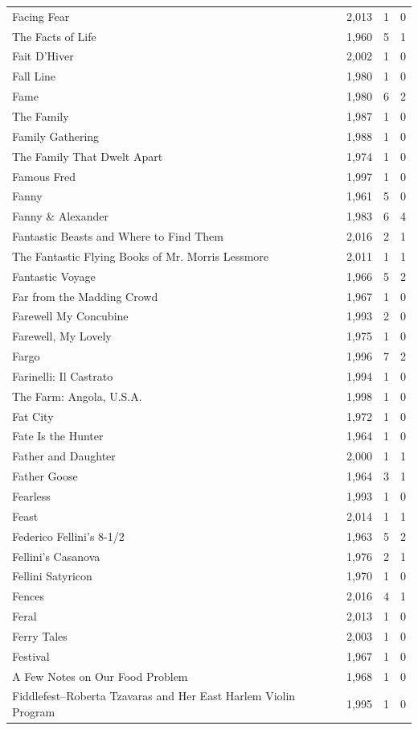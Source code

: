 \begin{tabular}{lrrr}
Facing Fear & 2,013 & 1 & 0 \\
The Facts of Life & 1,960 & 5 & 1 \\
Fait D'Hiver & 2,002 & 1 & 0 \\
Fall Line & 1,980 & 1 & 0 \\
Fame & 1,980 & 6 & 2 \\
The Family & 1,987 & 1 & 0 \\
Family Gathering & 1,988 & 1 & 0 \\
The Family That Dwelt Apart & 1,974 & 1 & 0 \\
Famous Fred & 1,997 & 1 & 0 \\
Fanny & 1,961 & 5 & 0 \\
Fanny \& Alexander & 1,983 & 6 & 4 \\
Fantastic Beasts and Where to Find Them & 2,016 & 2 & 1 \\
The Fantastic Flying Books of Mr. Morris Lessmore & 2,011 & 1 & 1 \\
Fantastic Voyage & 1,966 & 5 & 2 \\
Far from the Madding Crowd & 1,967 & 1 & 0 \\
Farewell My Concubine & 1,993 & 2 & 0 \\
Farewell, My Lovely & 1,975 & 1 & 0 \\
Fargo & 1,996 & 7 & 2 \\
Farinelli: Il Castrato & 1,994 & 1 & 0 \\
The Farm: Angola, U.S.A. & 1,998 & 1 & 0 \\
Fat City & 1,972 & 1 & 0 \\
Fate Is the Hunter & 1,964 & 1 & 0 \\
Father and Daughter & 2,000 & 1 & 1 \\
Father Goose & 1,964 & 3 & 1 \\
Fearless & 1,993 & 1 & 0 \\
Feast & 2,014 & 1 & 1 \\
Federico Fellini's 8-1/2 & 1,963 & 5 & 2 \\
Fellini's Casanova & 1,976 & 2 & 1 \\
Fellini Satyricon & 1,970 & 1 & 0 \\
Fences & 2,016 & 4 & 1 \\
Feral & 2,013 & 1 & 0 \\
Ferry Tales & 2,003 & 1 & 0 \\
Festival & 1,967 & 1 & 0 \\
A Few Notes on Our Food Problem & 1,968 & 1 & 0 \\
Fiddlefest--Roberta Tzavaras and Her East Harlem Violin Program & 1,995 & 1 & 0 \\

\end{tabular}
